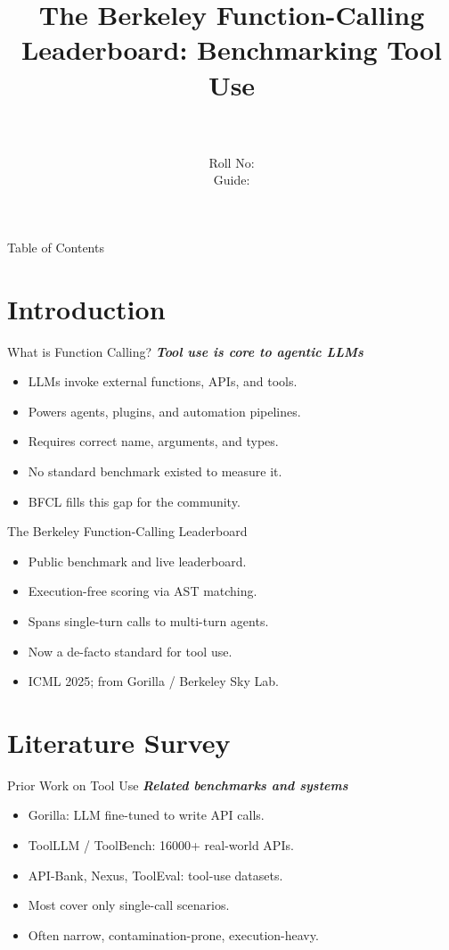 \documentclass{beamer}
\title[\seminarShortTitle]{The Berkeley Function-Calling Leaderboard: Benchmarking Tool Use}
\author[\seminarName\ (\seminarShortCollege)]{\seminarName \\ \seminarRoll \\ Roll No: \seminarClassRoll \\ Guide: \seminarGuide}
\institute[\seminarShortCollege]{\seminarDept \\ \seminarCollege}
\date{\seminarDate}
\begin{document}
\begin{frame}\titlepage\end{frame}
\begin{frame}{Table of Contents}\tableofcontents\end{frame}
\section{Introduction}
\begin{frame}{What is Function Calling?}
\textbf{\textit{Tool use is core to agentic LLMs}}
\begin{itemize}
\item LLMs invoke external functions, APIs, and tools.
\item Powers agents, plugins, and automation pipelines.
\item Requires correct name, arguments, and types.
\item No standard benchmark existed to measure it.
\item BFCL fills this gap for the community.
\end{itemize}
\end{frame}

\begin{frame}{The Berkeley Function-Calling Leaderboard}
\begin{itemize}
\item Public benchmark and live leaderboard.
\item Execution-free scoring via AST matching.
\item Spans single-turn calls to multi-turn agents.
\item Now a de-facto standard for tool use.
\item ICML 2025; from Gorilla / Berkeley Sky Lab.
\end{itemize}
\end{frame}

\section{Literature Survey}
\begin{frame}{Prior Work on Tool Use}
\textbf{\textit{Related benchmarks and systems}}
\begin{itemize}
\item Gorilla: LLM fine-tuned to write API calls.
\item ToolLLM / ToolBench: 16000+ real-world APIs.
\item API-Bank, Nexus, ToolEval: tool-use datasets.
\item Most cover only single-call scenarios.
\item Often narrow, contamination-prone, execution-heavy.
\end{itemize}
\end{frame}
\end{document}
